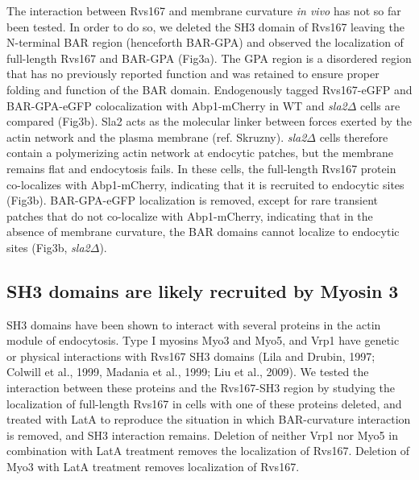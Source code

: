 \documentclass[9pt,lineno]{elife}
\begin{document}
The interaction between Rvs167 and membrane curvature \textit{in vivo} has not so far been tested. In order to do so, we deleted the SH3 domain of Rvs167 leaving the N-terminal BAR region (henceforth BAR-GPA) and observed the localization of full-length Rvs167 and BAR-GPA (Fig3a). The GPA region is a disordered region that has no previously reported function and was retained to ensure proper folding and function of the BAR domain. Endogenously tagged Rvs167-eGFP and BAR-GPA-eGFP colocalization with Abp1-mCherry in WT and \textit{sla2$\Delta$} cells are compared (Fig3b). Sla2 acts as the molecular linker between forces exerted by the actin network and the plasma membrane (ref. Skruzny). \textit{sla2$\Delta$} cells therefore contain a polymerizing actin network at endocytic patches, but the membrane remains flat and endocytosis fails. In these cells, the full-length Rvs167 protein co-localizes with Abp1-mCherry, indicating that it is recruited to endocytic sites (Fig3b). BAR-GPA-eGFP localization is removed, except for rare transient patches that do not co-localize with Abp1-mCherry, indicating that in the absence of membrane curvature, the BAR domains  cannot localize to endocytic sites (Fig3b, \textit{sla2$\Delta$}). 



\subsection{SH3 domains are likely recruited by Myosin 3}
SH3 domains have been shown to interact with several proteins in the actin module of endocytosis. Type I myosins Myo3 and Myo5, and Vrp1 have genetic or physical interactions with Rvs167 SH3 domains (Lila and Drubin, 1997; Colwill et al., 1999, Madania et al., 1999; Liu et al., 2009). 
We tested the interaction between these proteins and the Rvs167-SH3 region by studying the localization of full-length Rvs167 in cells with one of these proteins deleted, and treated with LatA to reproduce the situation in which BAR-curvature interaction is removed, and SH3 interaction remains. 
Deletion of neither Vrp1 nor Myo5 in combination with LatA treatment removes the localization of Rvs167. Deletion of Myo3 with LatA treatment removes localization of Rvs167. 
\end{document}
